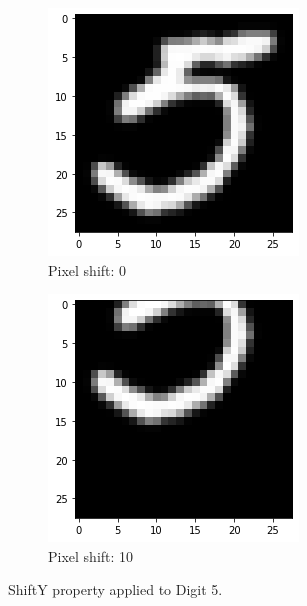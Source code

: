 \begin{figure}[htb!]
\begin{subfigure}[b]{.3\textwidth}
            \includegraphics[width=\textwidth]{images/shifty2.png}
            \caption{Pixel shift: 0}
            \label{fig:Rotate-misclass0}
        \end{subfigure}%
        \begin{subfigure}[b]{.3\textwidth}
            \centering
            \includegraphics[width=\linewidth]{images/shifty3.png}
            \caption{Pixel shift: 10}
            \label{fig:Rotate-misclass0}
        \end{subfigure}
        
        \caption{ShiftY property applied to Digit 5.}
        \label{fig:ShiftY-property}
    \end{figure}
    \FloatBarrier

